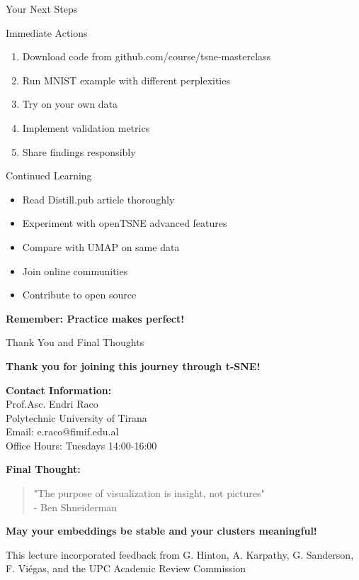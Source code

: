 \documentclass[aspectratio=169]{beamer}
\begin{document}
\begin{frame}{Your Next Steps}
\begin{block}{Immediate Actions}
\begin{enumerate}
\item Download code from github.com/course/tsne-masterclass
\item Run MNIST example with different perplexities
\item Try on your own data
\item Implement validation metrics
\item Share findings responsibly
\end{enumerate}
\end{block}

\begin{block}{Continued Learning}
\begin{itemize}
\item Read Distill.pub article thoroughly
\item Experiment with openTSNE advanced features
\item Compare with UMAP on same data
\item Join online communities
\item Contribute to open source
\end{itemize}
\end{block}

\vspace{0.2cm}
\colorbox{green!30}{\parbox{0.9\textwidth}{\centering\textbf{Remember: Practice makes perfect!}}}
\end{frame}

\begin{frame}{Thank You and Final Thoughts}
\begin{center}
\Large\textbf{Thank you for joining this journey through t-SNE!}
\end{center}

\vspace{0.5cm}
\textbf{Contact Information:}\\
Prof.Asc. Endri Raco\\
Polytechnic University of Tirana\\
Email: e.raco@fimif.edu.al\\
Office Hours: Tuesdays 14:00-16:00

\vspace{0.5cm}
\textbf{Final Thought:}
\begin{quote}
"The purpose of visualization is insight, not pictures"\\
\hfill - Ben Shneiderman
\end{quote}

\vspace{0.5cm}
\begin{center}
\colorbox{blue!30}{\parbox{0.8\textwidth}{\centering\textbf{May your embeddings be stable and your clusters meaningful!}}}
\end{center}

\vspace{0.3cm}
\small
This lecture incorporated feedback from G. Hinton, A. Karpathy, G. Sanderson,\\
F. Viégas, and the UPC Academic Review Commission
\end{frame}
\end{document}
